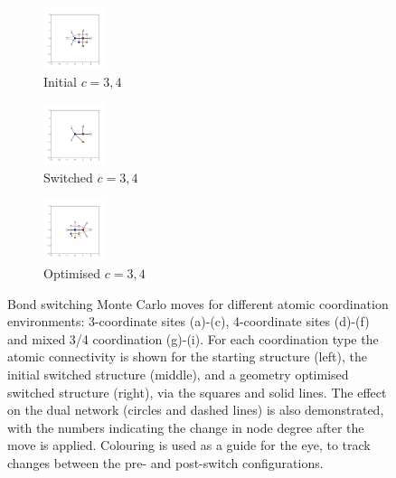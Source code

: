 \begin{figure}[bt]
     \vspace{5mm}
     \begin{subfigure}[b]{0.25\textwidth}
         \centering
         \includegraphics[height=1.8cm]{./figures/general_networks/bs_move_g.pdf}
         \caption{Initial $c=3,4$}
         \label{fig:bsmoveg}
     \end{subfigure}
     \hfill
     \begin{subfigure}[b]{0.25\textwidth}
         \centering
         \includegraphics[height=1.8cm]{./figures/general_networks/bs_move_h.pdf}
         \caption{Switched $c=3,4$}
         \label{fig:bsmoveh}
     \end{subfigure}
     \hfill
     \begin{subfigure}[b]{0.25\textwidth}
         \centering
         \includegraphics[height=1.8cm]{./figures/general_networks/bs_move_i.pdf}
         \caption{Optimised $c=3,4$}
         \label{fig:bsmovei}
     \end{subfigure}
     
     \caption{Bond switching Monte Carlo moves for different atomic coordination environments: 3\--coordinate sites (a)-(c), 4\--coordinate sites (d)-(f) and mixed 3/4 coordination (g)-(i). For each coordination type the atomic connectivity is shown for the starting structure (left), the initial switched structure (middle), and a geometry optimised switched structure (right), via the squares and solid lines. The effect on the dual network (circles and dashed lines) is also demonstrated, with the numbers indicating the change in node degree after the move is applied. Colouring is used as a guide for the eye, to track changes between the pre\-- and post\--switch configurations.
}
     \label{fig:bsmoves}
\end{figure}

